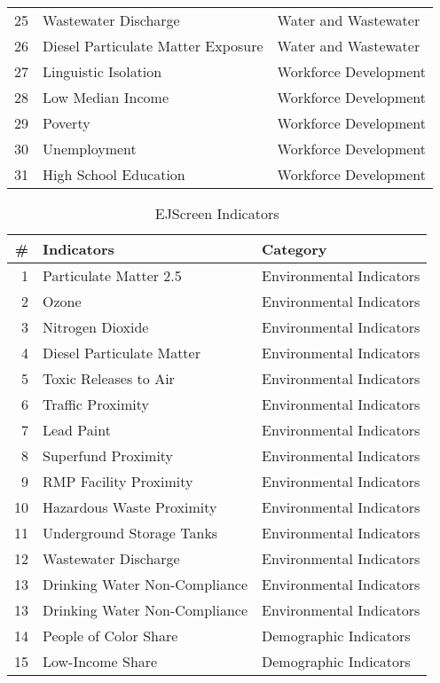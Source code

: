 \documentclass{article}
\begin{document}
\begin{table}[ht]
\begin{tabular}{@{}r l l@{}}
        25 & Wastewater Discharge & Water and Wastewater \\
        26 & Diesel Particulate Matter Exposure & Water and Wastewater \\
        27 & Linguistic Isolation & Workforce Development \\
        28 & Low Median Income & Workforce Development \\
        29 & Poverty & Workforce Development \\
        30 & Unemployment & Workforce Development \\
        31 & High School Education & Workforce Development \\
        \bottomrule %
    \end{tabular}
\end{table}

\begin{table}[ht]
    \centering
    \caption{EJScreen Indicators}
    \begin{tabular}{@{}r l l@{}} %
        \toprule %
        \textbf{\#} & \textbf{Indicators} & \textbf{Category} \\
        \midrule %
        1 & Particulate Matter 2.5 & Environmental Indicators \\
        2 & Ozone & Environmental Indicators \\
        3 & Nitrogen Dioxide & Environmental Indicators \\
        4 & Diesel Particulate Matter & Environmental Indicators \\
        5 & Toxic Releases to Air & Environmental Indicators \\
        6 & Traffic Proximity & Environmental Indicators \\
        7 & Lead Paint & Environmental Indicators \\
        8 & Superfund Proximity & Environmental Indicators \\
        9 & RMP Facility Proximity & Environmental Indicators \\
        10 & Hazardous Waste Proximity & Environmental Indicators \\
        11 & Underground Storage Tanks & Environmental Indicators \\
        12 & Wastewater Discharge & Environmental Indicators \\
        13 & Drinking Water Non-Compliance & Environmental Indicators \\
        13 & Drinking Water Non-Compliance & Environmental Indicators \\
        14 & People of Color Share & Demographic Indicators \\
        15 & Low-Income Share & Demographic Indicators \\
        \bottomrule %
    \end{tabular}
\end{table}
\end{document}
